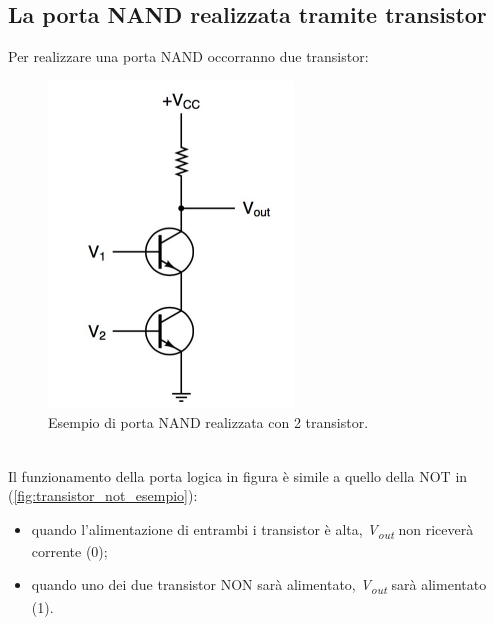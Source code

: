 \documentclass[12pt]{article}
\begin{document}
\subsection{La porta NAND realizzata tramite transistor}
Per realizzare una porta NAND occorranno due transistor:
\begin{figure}[!htb]
    \centering
    \includegraphics[width=.5\textwidth, height=.4\textheight,keepaspectratio]{porte_logiche/transistor_nand_ex.png} %
    \begin{center}
        \caption{\label{fig:transistor_nand_esempio}Esempio di porta NAND realizzata con 2 transistor.} %
    \end{center}
\end{figure}\\
Il funzionamento della porta logica in figura è simile a quello della NOT in (\ref{fig:transistor_not_esempio}): 
\begin{itemize}
    \item quando l'alimentazione di entrambi i transistor è alta, \textit{V\textsubscript{out}} non riceverà corrente (0);
    \item quando uno dei due transistor NON sarà alimentato, \textit{V\textsubscript{out}} sarà alimentato (1).
\end{itemize}
\end{document}

